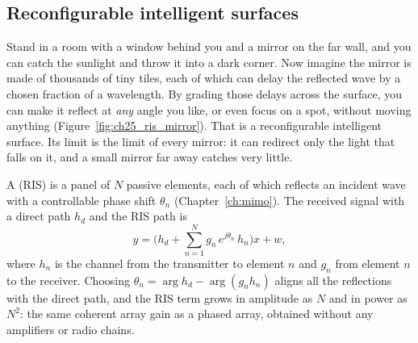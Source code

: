 \subsection{Reconfigurable intelligent surfaces}

\begin{analogy}
Stand in a room with a window behind you and a mirror on the far wall, and you can catch the
sunlight and throw it into a dark corner. Now imagine the mirror is made of thousands of tiny tiles,
each of which can delay the reflected wave by a chosen fraction of a wavelength. By grading those
delays across the surface, you can make it reflect at \emph{any} angle you like, or even focus on a
spot, without moving anything (Figure~\ref{fig:ch25_ris_mirror}). That is a reconfigurable
intelligent surface. Its limit is the limit of every mirror: it can redirect only the light that
falls on it, and a small mirror far away catches very little.
\end{analogy}

A  (RIS) is a panel of $N$ passive elements, each of which
reflects an incident wave with a controllable phase shift $\theta_n$ (Chapter~\ref{ch:mimo}). The
received signal with a direct path $h_d$ and the RIS path is
\begin{equation}
y=\Big(h_d+\sum_{n=1}^{N}g_n\,e^{j\theta_n}\,h_n\Big)x+w,
\label{eq:ch25:ris}
\end{equation}
where $h_n$ is the channel from the transmitter to element $n$ and $g_n$ from element $n$ to the
receiver. Choosing $\theta_n=\arg h_d-\arg(g_nh_n)$ aligns all the reflections with the direct path,
and the RIS term grows in amplitude as $N$ and in power as $N^2$: the same coherent array gain as a
phased array, obtained without any amplifiers or radio chains.



